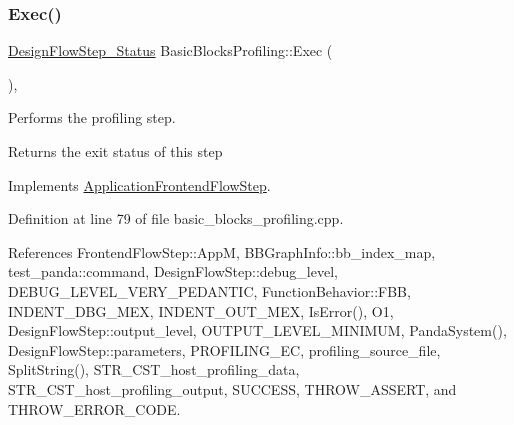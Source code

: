 \subsubsection{\texorpdfstring{Exec()}{Exec()}}
{\footnotesize\ttfamily \hyperlink{design__flow__step_8hpp_afb1f0d73069c26076b8d31dbc8ebecdf}{Design\+Flow\+Step\+\_\+\+Status} Basic\+Blocks\+Profiling\+::\+Exec (\begin{DoxyParamCaption}{ }\end{DoxyParamCaption})\hspace{0.3cm}{\ttfamily [override]}, {\ttfamily [virtual]}}



Performs the profiling step. 

\begin{DoxyReturn}{Returns}
the exit status of this step 
\end{DoxyReturn}


Implements \hyperlink{classApplicationFrontendFlowStep_a2bf060a5ebc1735635dc5c7773387a25}{Application\+Frontend\+Flow\+Step}.



Definition at line 79 of file basic\+\_\+blocks\+\_\+profiling.\+cpp.



References Frontend\+Flow\+Step\+::\+AppM, B\+B\+Graph\+Info\+::bb\+\_\+index\+\_\+map, test\+\_\+panda\+::command, Design\+Flow\+Step\+::debug\+\_\+level, D\+E\+B\+U\+G\+\_\+\+L\+E\+V\+E\+L\+\_\+\+V\+E\+R\+Y\+\_\+\+P\+E\+D\+A\+N\+T\+IC, Function\+Behavior\+::\+F\+BB, I\+N\+D\+E\+N\+T\+\_\+\+D\+B\+G\+\_\+\+M\+EX, I\+N\+D\+E\+N\+T\+\_\+\+O\+U\+T\+\_\+\+M\+EX, Is\+Error(), O1, Design\+Flow\+Step\+::output\+\_\+level, O\+U\+T\+P\+U\+T\+\_\+\+L\+E\+V\+E\+L\+\_\+\+M\+I\+N\+I\+M\+UM, Panda\+System(), Design\+Flow\+Step\+::parameters, P\+R\+O\+F\+I\+L\+I\+N\+G\+\_\+\+EC, profiling\+\_\+source\+\_\+file, Split\+String(), S\+T\+R\+\_\+\+C\+S\+T\+\_\+host\+\_\+profiling\+\_\+data, S\+T\+R\+\_\+\+C\+S\+T\+\_\+host\+\_\+profiling\+\_\+output, S\+U\+C\+C\+E\+SS, T\+H\+R\+O\+W\+\_\+\+A\+S\+S\+E\+RT, and T\+H\+R\+O\+W\+\_\+\+E\+R\+R\+O\+R\+\_\+\+C\+O\+DE.

